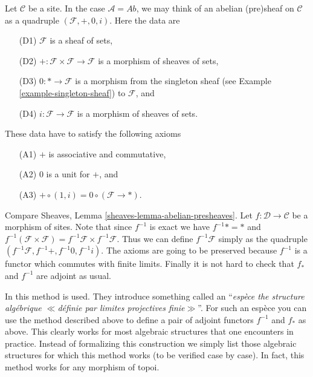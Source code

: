 \medskip\noindent
Let $\mathcal{C}$ be a site.
In the case $\mathcal{A} = \textit{Ab}$,
we may think of an abelian (pre)sheaf on $\mathcal{C}$
as a quadruple $(\mathcal{F}, +, 0, i)$.
Here the data are
\begin{enumerate}
\item[(D1)] $\mathcal{F}$ is a sheaf of sets,
\item[(D2)] $+ : \mathcal{F} \times \mathcal{F} \to \mathcal{F}$ is
a morphism of sheaves of sets,
\item[(D3)] $0 : * \to \mathcal{F}$ is a morphism from the
singleton sheaf (see Example \ref{example-singleton-sheaf})
to $\mathcal{F}$, and
\item[(D4)] $i : \mathcal{F} \to \mathcal{F}$ is a morphism of sheaves
of sets.
\end{enumerate}
These data have to satisfy the following axioms
\begin{enumerate}
\item[(A1)] $+$ is associative and commutative,
\item[(A2)] $0$ is a unit for $+$, and
\item[(A3)] $+ \circ (1, i) = 0 \circ (\mathcal{F} \to *)$.
\end{enumerate}
Compare Sheaves, Lemma \ref{sheaves-lemma-abelian-presheaves}.
Let $f : \mathcal{D} \to \mathcal{C}$ be a morphism of sites.
Note that since $f^{-1}$ is exact we have
$f^{-1}* = *$ and
$f^{-1}(\mathcal{F} \times \mathcal{F}) =
f^{-1}\mathcal{F} \times f^{-1}\mathcal{F}$.
Thus we can define $f^{-1}\mathcal{F}$ simply as the quadruple
$(f^{-1}\mathcal{F}, f^{-1}+, f^{-1}0, f^{-1}i)$. The axioms
are going to be preserved because $f^{-1}$ is a functor
which commutes with finite limits. Finally it is not hard
to check that $f_*$ and $f^{-1}$ are adjoint as usual.

\medskip\noindent
In \cite{SGA4} this method is used. They introduce something
called an ``{\it esp\`ece the structure alg\'ebrique $\ll$d\'efinie
par limites projectives finie$\gg$}''. For such an esp\`ece you
can use the method described above to define a pair of adjoint
functors $f^{-1}$ and $f_*$ as above. This clearly works for most
algebraic structures that one encounters in practice.
Instead of formalizing this construction we simply list those
algebraic structures for which this method works (to be
verified case by case). In fact, this method works for any
morphism of topoi.

